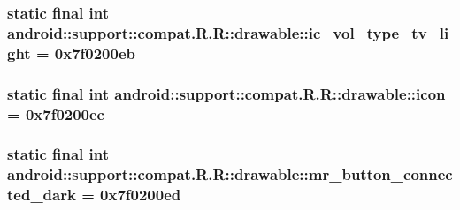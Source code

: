 \hypertarget{classandroid_1_1support_1_1compat_1_1_r_1_1drawable_2a77c925f88b0c63a16f4c5d20d10e08}{
\subsubsection[{ic\_\-vol\_\-type\_\-tv\_\-light}]{\setlength{\rightskip}{0pt plus 5cm}static final int android::support::compat.R.R::drawable::ic\_\-vol\_\-type\_\-tv\_\-light = 0x7f0200eb}}
\label{classandroid_1_1support_1_1compat_1_1_r_1_1drawable_2a77c925f88b0c63a16f4c5d20d10e08}


\hypertarget{classandroid_1_1support_1_1compat_1_1_r_1_1drawable_03eccb3d293dead268b38068a2b36a97}{
\subsubsection[{icon}]{\setlength{\rightskip}{0pt plus 5cm}static final int android::support::compat.R.R::drawable::icon = 0x7f0200ec}}
\label{classandroid_1_1support_1_1compat_1_1_r_1_1drawable_03eccb3d293dead268b38068a2b36a97}


\hypertarget{classandroid_1_1support_1_1compat_1_1_r_1_1drawable_613c0b79d60831d01320e070e189a1c5}{
\subsubsection[{mr\_\-button\_\-connected\_\-dark}]{\setlength{\rightskip}{0pt plus 5cm}static final int android::support::compat.R.R::drawable::mr\_\-button\_\-connected\_\-dark = 0x7f0200ed}}
\label{classandroid_1_1support_1_1compat_1_1_r_1_1drawable_613c0b79d60831d01320e070e189a1c5}


